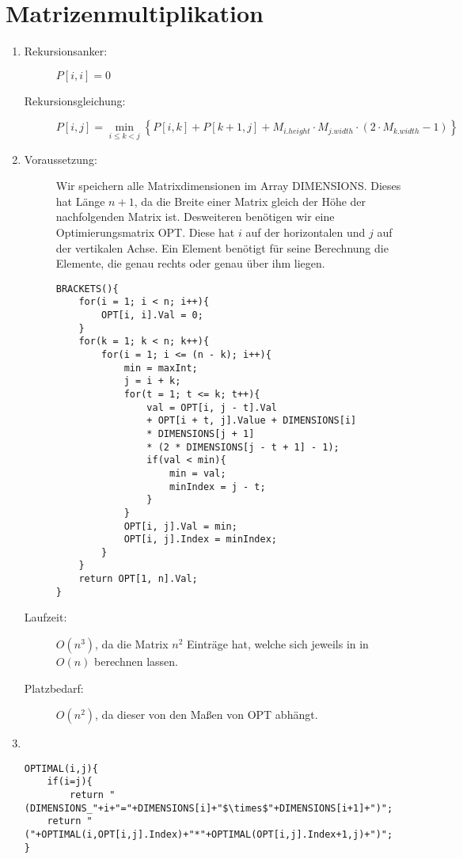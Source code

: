 \documentclass[a4paper,10pt]{scrartcl}
\begin{document}
\section{Matrizenmultiplikation}
\begin{enumerate}
\item \begin{description}
	\item[Rekursionsanker:] $P\left[i, i\right] = 0$
	\item[Rekursionsgleichung:] $P\left[i, j\right] = \min\limits_{i \leq k < j}\left\{P\left[i, k\right] + P\left[k + 1, j\right] + M_{i.height} \cdot M_{j.width} \cdot \left( 2 \cdot M_{k.width} - 1 \right) \right\}$
\end{description} 
\item \begin{description}
	\item[Voraussetzung:] Wir speichern alle Matrixdimensionen im
	Array DIMENSIONS. Dieses hat Länge $n+1$, da die Breite einer
	Matrix gleich der Höhe der nachfolgenden Matrix ist.
	Desweiteren benötigen wir eine Optimierungsmatrix OPT. Diese hat
	$i$ auf der horizontalen und $j$ auf der vertikalen Achse. Ein
	Element benötigt für seine Berechnung die Elemente, die genau rechts oder genau über ihm liegen.
\begin{lstlisting}[mathescape=true,numbers=none]
BRACKETS(){
	for(i = 1; i < n; i++){
		OPT[i, i].Val = 0;
	}
	for(k = 1; k < n; k++){
		for(i = 1; i <= (n - k); i++){
			min = maxInt;
			j = i + k;
			for(t = 1; t <= k; t++){
				val = OPT[i, j - t].Val 
				+ OPT[i + t, j].Value + DIMENSIONS[i] 
				* DIMENSIONS[j + 1] 
				* (2 * DIMENSIONS[j - t + 1] - 1);
				if(val < min){
					min = val;
					minIndex = j - t;
				}
			}
			OPT[i, j].Val = min;
			OPT[i, j].Index = minIndex;
		}
	}
	return OPT[1, n].Val;
}
\end{lstlisting}
	\item[Laufzeit:] $O(n^3)$, da die Matrix $n^2$ Einträge hat,
	welche sich jeweils in in $O(n)$ berechnen lassen.
	\item[Platzbedarf:] $O(n^2)$, da dieser von den Maßen von OPT
	abhängt.
	\end{description}
\item \\
\begin{lstlisting}[mathescape=true,numbers=none]
OPTIMAL(i,j){
	if(i=j){
		return "(DIMENSIONS_"+i+"="+DIMENSIONS[i]+"$\times$"+DIMENSIONS[i+1]+")";
	return "("+OPTIMAL(i,OPT[i,j].Index)+"*"+OPTIMAL(OPT[i,j].Index+1,j)+")";
}
\end{lstlisting}
\end{enumerate}
\end{document}
